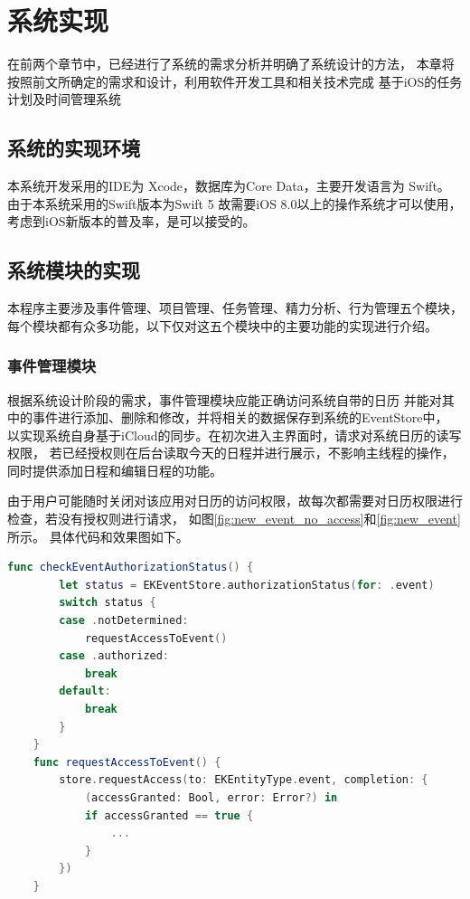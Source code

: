 
\chapter{系统实现}

在前两个章节中，已经进行了系统的需求分析并明确了系统设计的方法，
本章将按照前文所确定的需求和设计，利用软件开发工具和相关技术完成
基于iOS的任务计划及时间管理系统

\section{系统的实现环境}
本系统开发采用的IDE为 Xcode，数据库为Core Data，主要开发语言为 Swift。
由于本系统采用的Swift版本为Swift 5 故需要iOS 8.0以上的操作系统才可以使用， \parencite{wals2018mastering}
考虑到iOS新版本的普及率，是可以接受的。

\section{系统模块的实现}
本程序主要涉及事件管理、项目管理、任务管理、精力分析、行为管理五个模块，
每个模块都有众多功能，以下仅对这五个模块中的主要功能的实现进行介绍。

\subsection{事件管理模块}
根据系统设计阶段的需求，事件管理模块应能正确访问系统自带的日历
并能对其中的事件进行添加、删除和修改，并将相关的数据保存到系统的EventStore中，
以实现系统自身基于iCloud的同步。在初次进入主界面时，请求对系统日历的读写权限，
若已经授权则在后台读取今天的日程并进行展示，不影响主线程的操作，同时提供添加日程和编辑日程的功能。

由于用户可能随时关闭对该应用对日历的访问权限，故每次都需要对日历权限进行检查，若没有授权则进行请求，
如图\ref{fig:new_event_no_access}和\ref{fig:new_event}所示。
具体代码和效果图如下。

\begin{lstlisting}[language={Swift}, caption={请求日历权限代码逻辑}]
	func checkEventAuthorizationStatus() {
		let status = EKEventStore.authorizationStatus(for: .event)
		switch status {
		case .notDetermined:
			requestAccessToEvent()
		case .authorized:
			break
		default:
			break
		}
	}
	func requestAccessToEvent() {
		store.requestAccess(to: EKEntityType.event, completion: {
			(accessGranted: Bool, error: Error?) in
			if accessGranted == true {
				...
			}
		})
	}
\end{lstlisting}

